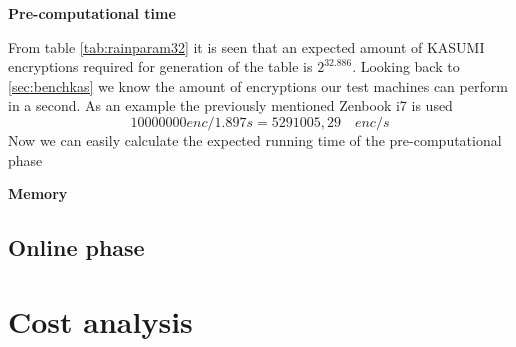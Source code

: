 \textbf{Pre-computational time}

From table \ref{tab:rainparam32} it is seen that an expected amount of
KASUMI encryptions required for generation of the table is
$2^{32.886}$. Looking back to \ref{sec:benchkas} we know the
amount of encryptions our test machines can perform in a second. As an
example the previously mentioned Zenbook i7 is used
\[10000000 enc / 1.897 s = 5291005,29 \quad enc/s\]
Now we can easily calculate the expected running time of the
pre-computational phase 


\textbf{Memory}


\quad{}

\quad{}
\subsection{Online phase}

\section{Cost analysis}
